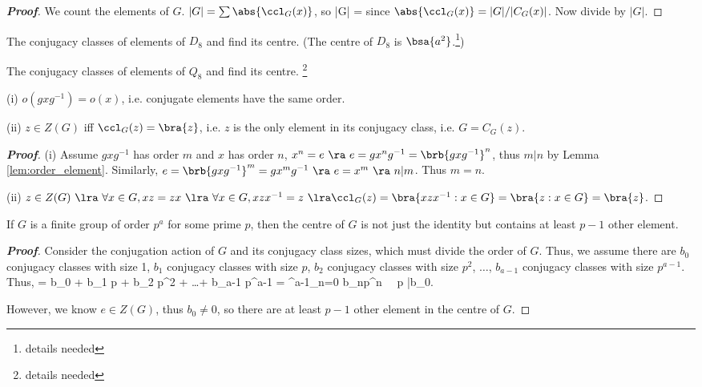 \begin{proof}[\bf Proof]
We count the elements of $G$. $|G| = \sum \abs{\ccl_G(x)}$, so
\be
|G| = \sum {}
\ee
since $\abs{\ccl_G(x)} = |G|/|C_G(x)|$. Now divide by $|G|$.
\end{proof}


\begin{example}
The conjugacy classes of elements of $D_8$ and find its centre. (The centre of $D_8$ is $\bsa{a^2}$.\footnote{details needed})
\end{example}

\begin{example}
The conjugacy classes of elements of $Q_8$ and find its centre. \footnote{details needed}
\end{example}

\begin{proposition}\label{pro:conjugate_element}
\ben
\item [(i)] $o(gxg^{-1}) = o(x)$, i.e. conjugate elements have the same order.
\item [(ii)] $z\in Z(G)$ iff $\ccl_G(z)=\bra{z}$, i.e. $z$ is the only element in its conjugacy class, i.e. $G=C_G(z)$.
\een
\end{proposition}

\begin{proof}[\bf Proof]
\ben
\item [(i)] Assume $gxg^{-1}$ has order $m$ and $x$ has order $n$, $x^n = e \ \ra \ e = gx^n g^{-1} = \brb{gxg^{-1}}^n$, thus $m|n$ by Lemma \ref{lem:order_element}. Similarly, $e = \brb{gxg^{-1}}^m = gx^m g^{-1} \ \ra \ e = x^m \ \ra \ n|m$. Thus $m=n$.
\item [(ii)] $z\in Z(G) \ \lra \ \forall x\in G, xz = zx \ \lra \ \forall x\in G, xzx^{-1} = z \ \lra \ccl_G(z) = \bra{xzx^{-1}:x\in G} = \bra{z:x\in G} = \bra{z}$.
\een
\end{proof}



\begin{proposition}\label{pro:prime_center}
If $G$ is a finite group of order $p^a$ for some prime $p$, then the centre of $G$ is not just the identity but contains at least $p-1$ other element.
\end{proposition}
\begin{proof}[\bf Proof]
Consider the conjugation action of $G$ and its conjugacy class sizes, which must divide the order of $G$. Thus, we assume there are $b_0$ conjugacy classes with size 1, $b_1$ conjugacy classes with size $p$, $b_2$ conjugacy classes with size $p^2$, $\dots$, $b_{a-1}$ conjugacy classes with size $p^{a-1}$. Thus,
\be
{} = b_0  + b_1 \times p + b_2 \times p^2 + \dots + b_{a-1} \times p^{a-1} = \sum^{a-1}_{n=0} b_np^n \ \ra \ p |b_0.
\ee

However, we know $e\in Z(G)$, thus $b_0 \neq 0$, so there are at least $p-1$ other element in the centre of $G$.
\end{proof}


